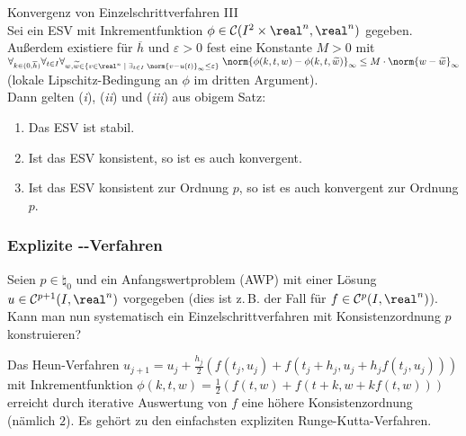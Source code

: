 \begin{Satz}{Konvergenz von Einzelschrittverfahren III}\\
    Sei ein ESV mit Inkrementfunktion
    $\phi \in \C(I^2 \times \real^n, \real^n)$ gegeben.
    Außerdem existiere für $\overline{h}$ und $\varepsilon > 0$ fest
    eine Konstante $M > 0$ mit\\
    $\forall_{k \in (0, \overline{h})}
    \forall_{t \in I} \forall_{w, \widetilde{w} \in
    \{v \in \real^n \;|\;
    \exists_{t \in I}\; \norm{v - u(t)}_\infty \le \varepsilon\}}\;
    \norm{\phi(k, t, w) - \phi(k, t, \widetilde{w})}_\infty \le
    M \cdot \norm{w - \widetilde{w}}_\infty$\\
    (lokale Lipschitz-Bedingung an $\phi$ im dritten Argument).\\
    Dann gelten (\emph{i}), (\emph{ii}) und (\emph{iii}) aus obigem Satz:
    \begin{enumerate}[label=(\emph{\roman*})]
        \item
        Das ESV ist stabil.
        
        \item
        Ist das ESV konsistent, so ist es auch konvergent.
        
        \item
        Ist das ESV konsistent zur Ordnung $p$, so ist es auch konvergent zur
        Ordnung $p$.
    \end{enumerate}
\end{Satz}

\pagebreak

\subsubsection{%
    Explizite --Verfahren%
}

\begin{Bem}
    Seien $p \in \natural_0$ und ein Anfangswertproblem (AWP) mit einer
    Lösung\\
    $u \in \C^{p+1}(I, \real^n)$ vorgegeben
    (dies ist z.\,B. der Fall für $f \in \C^p(I, \real^n)$).\\
    Kann man nun systematisch ein Einzelschrittverfahren mit
    Konsistenzordnung $p$ konstruieren?
\end{Bem}

\begin{Bsp}
    Das Heun-Verfahren $u_{j+1} = u_j + \frac{h_j}{2}
    (f(t_j, u_j) + f(t_j + h_j, u_j + h_j f(t_j, u_j)))$
    mit Inkrementfunktion
    $\phi(k, t, w) = \frac{1}{2} (f(t, w) + f(t + k, w + k f(t, w)))$
    erreicht durch iterative Auswertung von $f$ eine höhere Konsistenzordnung
    (nämlich $2$).
    Es gehört zu den einfachsten expliziten Runge-Kutta-Verfahren.
\end{Bsp}

